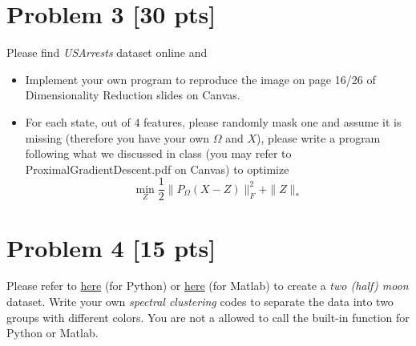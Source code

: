 \documentclass[11pt]{article}
\begin{document}
\section*{Problem 3 [30 pts]}
Please find \textit{USArrests} dataset online and 
\begin{itemize}
	\item Implement your own program to reproduce the image on page 16/26 of  Dimensionality Reduction slides on Canvas.
	\item For each state, out of 4 features, please randomly mask one and assume it is missing (therefore you have your own $\Omega$ and $X$), please write a program following what we discussed in class (you may refer to ProximalGradientDescent.pdf on Canvas) to optimize  
		\begin{equation}
		\min_{Z} \frac{1}{2}\|P_\Omega(X-Z)\|_F^2+\|Z\|_*
	\end{equation}
\end{itemize}


\newpage

\section*{Problem 4 [15 pts]}
Please refer to \href{https://shadow-ssml.readthedocs.io/en/latest/examples/halfmoons_example.html}{here} (for Python) or \href{https://github.com/jaejun-yoo/shallow-DANN-two-moon-dataset}{here} (for Matlab) to create a \textit{two (half) moon} dataset. Write your own \textit{spectral clustering} codes to separate the data into two groups with different colors.  You are not a allowed to call the built-in function for Python or Matlab.
\newpage
\end{document}

